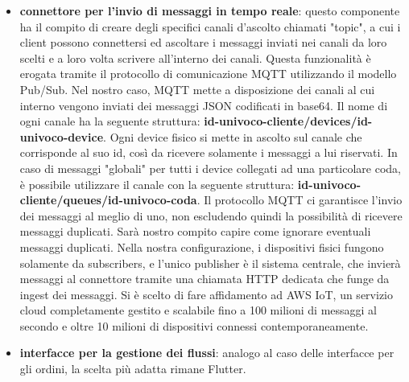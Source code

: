 \documentclass[a4paper, titlepage, 12pt, openright, twoside]{book}
\begin{document}
\begin{itemize}
	\item \textbf{connettore per l'invio di messaggi in tempo reale}: questo componente ha il compito di creare degli specifici canali d'ascolto chiamati "topic",
				 a cui i client possono connettersi ed ascoltare i messaggi inviati nei canali da loro scelti e a loro volta scrivere all'interno dei canali. Questa funzionalità è erogata tramite il protocollo di comunicazione MQTT utilizzando il modello Pub/Sub. Nel nostro caso, MQTT mette a disposizione dei canali al cui interno vengono inviati
				 dei messaggi JSON codificati in base64. Il nome di ogni canale ha la seguente struttura: \textbf{id-univoco-cliente/devices/id-univoco-device}.
				 Ogni device fisico si mette in ascolto sul canale che corrisponde al suo id, così da ricevere solamente i messaggi a lui riservati. In caso di messaggi "globali"
				 per tutti i device collegati ad una particolare coda, è possibile utilizzare il canale con la seguente struttura: \textbf{id-univoco-cliente/queues/id-univoco-coda}.
				 Il protocollo MQTT ci garantisce l'invio dei messaggi al meglio di uno, non escludendo quindi la possibilità di ricevere messaggi duplicati. Sarà nostro compito
				 capire come ignorare eventuali messaggi duplicati. Nella nostra configurazione, i dispositivi fisici fungono solamente da subscribers, e l'unico publisher è 
				 il sistema centrale, che invierà messaggi al connettore tramite una chiamata HTTP dedicata che funge da ingest dei messaggi. 
				 Si è scelto di fare affidamento ad AWS IoT, un servizio cloud completamente gestito e scalabile fino a 100 milioni
				 di messaggi al secondo e oltre 10 milioni di dispositivi connessi contemporaneamente.
				 
	\item \textbf{interfacce per la gestione dei flussi}: analogo al caso delle interfacce per gli ordini, la scelta più adatta rimane Flutter.
	
\end{itemize}
\end{document}
